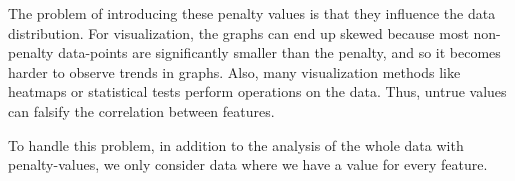 The problem of introducing these penalty values is that they influence the data distribution.
For visualization, the graphs can end up skewed because most non-penalty data-points are significantly smaller than the penalty, 
and so it becomes harder to observe trends in graphs. Also, many visualization methods like heatmaps or statistical tests perform operations on the
data. Thus, untrue values can falsify the correlation between features.

To handle this problem, in addition to the analysis of the whole data with penalty-values, we only consider data where we have a value for every feature.